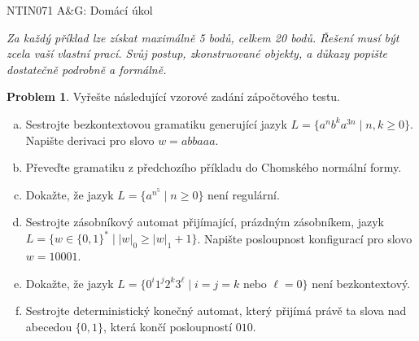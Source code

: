 \documentclass[a4paper,12pt]{article}
\theoremstyle{definition}
\newtheorem{problem}{Problem}
\begin{document}
\begin{center}
    \large{NTIN071 A\&G: Domácí úkol}    
\end{center}


{\it Za každý příklad lze získat maximálně 5 bodů, celkem 20 bodů. Řešení musí být zcela vaší vlastní prací. Svůj postup, zkonstruované objekty, a důkazy popište dostatečně podrobně a formálně.}

\bigskip

\begin{problem}

    Vyřešte následující vzorové zadání zápočtového testu. 

    \begin{enumerate}[(a)]
        \item Sestrojte bezkontextovou gramatiku generující jazyk $L=\{a^nb^ka^{3n}\mid n,k\geq 0\}$. Napište derivaci pro slovo $w=abbaaa$.
        \item Převeďte gramatiku z předchozího příkladu do Chomského normální formy.
        \item Dokažte, že jazyk $L=\{a^{n^5}\mid n\geq 0\}$ není regulární.
        \item Sestrojte zásobníkový automat přijímající, prázdným zásobníkem, jazyk $L=\{w\in\{0,1\}^*\mid |w|_0\geq |w|_1 + 1\}$. Napište posloupnost konfigurací pro slovo $w=10001$.
        \item Dokažte, že jazyk $L=\{0^i1^j2^k3^\ell\mid i=j=k\text{ nebo }\ell=0\}$ není bezkontextový.
        \item Sestrojte deterministický konečný automat, který přijímá právě ta slova nad abecedou $\{0,1\}$, která končí posloupností $010$.
    \end{enumerate}

\end{problem}


\bigskip
\end{document}
